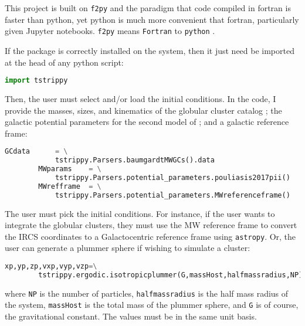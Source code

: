 \documentclass{article}
\begin{document}
    This project is built on \texttt{f2py} and the paradigm that code compiled in fortran is faster than python, yet python is much more convenient that fortran, particularly given Jupyter notebooks. \texttt{f2py} means \texttt{Fortran} to \texttt{python} \citep{peterson2009f2py}. 

    If the package is correctly installed on the system, then it just need be imported at the head of any python script:
    \small
    \begin{lstlisting}[language=python]
        import tstrippy    
    \end{lstlisting}
    \normalsize

    Then, the user must select and/or load the initial conditions. In the code, I provide the masses, sizes, and kinematics of the globular cluster catalog \citep{2018MNRAS.478.1520B}; the galactic potential parameters for the second model of \citep{2017A&A...598A..66P}; and a galactic reference frame: 
    \small
    \begin{lstlisting}[language=python]
        GCdata      = \
            tstrippy.Parsers.baumgardtMWGCs().data
        MWparams    = \
            tstrippy.Parsers.potential_parameters.pouliasis2017pii()
        MWrefframe  = \
            tstrippy.Parsers.potential_parameters.MWreferenceframe()
    \end{lstlisting}
    \normalsize

    The user must pick the initial conditions. For instance, if the user wants to integrate the globular clusters, they must use the MW reference frame to convert the IRCS coordinates to a Galactocentric reference frame using \texttt{astropy}. Or, the user can generate a plummer sphere if wishing to simulate a cluster: 
    \small
    \begin{lstlisting}[language=python]
        xp,yp,zp,vxp,vyp,vzp=\
        tstrippy.ergodic.isotropicplummer(G,massHost,halfmassradius,NP)
    \end{lstlisting}
    where \texttt{NP} is the number of particles, \texttt{halfmassradius} is the half mass radius of the system, \texttt{massHost} is the total mass of the plummer sphere, and \texttt{G} is of course, the gravitational constant. The values must be in the same unit basis. 
\end{document}
